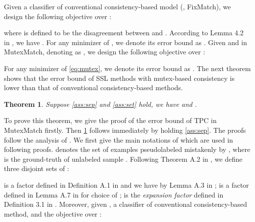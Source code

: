 \documentclass[lettersize,journal]{IEEEtran}
\theoremstyle{plain}
\newtheorem{theorem}{Theorem}[section]
\theoremstyle{definition}
\theoremstyle{remark}
\begin{document}
Given a classifier  of conventional consistency-based model (\eg, FixMatch), we design the following objective over :

where  is defined to be the disagreement between   and . According to Lemma 4.2 in \cite{wei2020theoretical}, we have . For any minimizer  of , we denote its error bound as .
Given   and   in MutexMatch,
denoting  as , 
we design the following objective over :


For any minimizer  of \cref{eq:mutex}, we denote its error bound as . 
The next theorem shows that the error bound of SSL methods with mutex-based consistency is lower than that of conventional consistency-based methods.
\begin{theorem}
\label{the}
Suppose \cref{ass:sep} and \ref{ass:set} hold, we have  and  .
\end{theorem}

To prove this theorem, we give the proof of the error bound of TPC  in MutexMatch firstly. Then \cref{the} follows immediately by holding \cref{ass:sep}.
The proofs follow the analysis of \cite{wei2020theoretical}. We first give the main notations of \cite{wei2020theoretical} which are used in following proofs. 
 denotes the set of examples pseudolabeled mistakenly by , where  is the ground-truth of unlabeled sample .
Following Theorem A.2 in \cite{wei2020theoretical}, we define three disjoint sets of : 


 is a factor defined in Definition A.1 in \cite{wei2020theoretical} and we have   by Lemma A.3 in \cite{wei2020theoretical};  is a factor defined in Lemma A.7 in \cite{wei2020theoretical} for choice of ;  is the \textit{expansion factor} defined in Definition 3.1 in \cite{wei2020theoretical}. 
Moreover, given , a classifier of conventional consistency-based method, and the objective over  :
\end{document}
